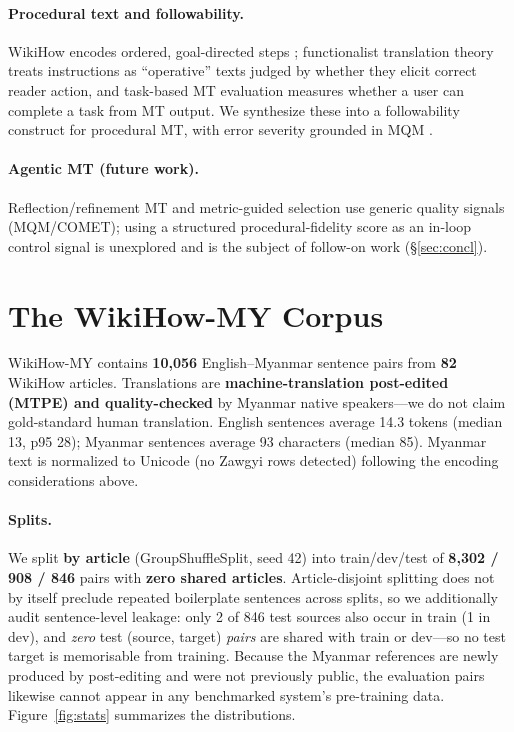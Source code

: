 \documentclass[11pt]{article}
\begin{document}
\paragraph{Procedural text and followability.} WikiHow encodes ordered, goal-directed steps
\citep{wikilingua2020}; functionalist translation theory \citep{reissvermeer1984} treats
instructions as ``operative'' texts judged by whether they elicit correct reader action,
and task-based MT evaluation \citep{gale_taskbased} measures whether a user can complete a
task from MT output. We synthesize these into a followability construct for procedural MT,
with error severity grounded in MQM \citep{mqm2021}.

\paragraph{Agentic MT (future work).} Reflection/refinement MT \citep{selfrefine2023,
ng2024transagent,tear2025,llmrefine2024} and metric-guided selection \citep{maps2024} use
generic quality signals (MQM/COMET); using a structured procedural-fidelity score as an
in-loop control signal is unexplored and is the subject of follow-on work (\S\ref{sec:concl}).

\section{The WikiHow-MY Corpus}\label{sec:corpus}
WikiHow-MY contains \textbf{10{,}056} English--Myanmar sentence pairs from \textbf{82}
WikiHow articles. Translations are \textbf{machine-translation post-edited (MTPE) and
quality-checked} by Myanmar native speakers---we do not claim gold-standard human
translation. English sentences average 14.3 tokens (median 13, p95 28); Myanmar sentences
average 93 characters (median 85). Myanmar text is normalized to Unicode (no Zawgyi rows
detected) following the encoding considerations above.

\paragraph{Splits.} We split \textbf{by article} (GroupShuffleSplit, seed 42) into
train/dev/test of \textbf{8{,}302 / 908 / 846} pairs with \textbf{zero shared articles}.
Article-disjoint splitting does not by itself preclude repeated boilerplate sentences across
splits, so we additionally audit sentence-level leakage: only 2 of 846 test sources also
occur in train (1 in dev), and \emph{zero} test (source, target) \emph{pairs} are shared with
train or dev---so no test target is memorisable from training. Because the Myanmar references
are newly produced by post-editing and were not previously public, the evaluation pairs likewise
cannot appear in any benchmarked system's pre-training data. Figure~\ref{fig:stats}
summarizes the distributions.
\end{document}
